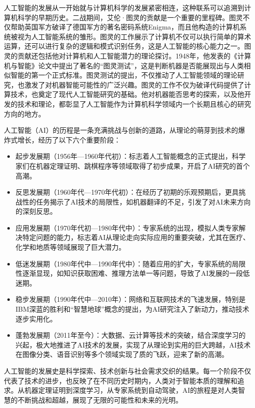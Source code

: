 人工智能的发展从一开始就与计算机科学的发展紧密相连，这种联系可以追溯到计算机科学的早期历史。二战期间，艾伦·图灵的贡献是一个重要的里程碑。图灵不仅帮助英国军方破译了德国军方的著名密码系统Enigma，而且他构造的计算机系统被视为人工智能系统的雏形。图灵的工作展示了计算机不仅可以执行简单的算术运算，还可以进行复杂的逻辑和模式识别任务，这是人工智能的核心能力之一。图灵的贡献还包括他对计算机和人工智能潜力的理论探讨。1948年，他发表的《计算机与智能》论文中提出了著名的“图灵测试”，这是判断机器是否能展现出与人类相似智能的第一个正式标准。图灵测试的提出，不仅推动了人工智能领域的理论研究，也激发了对机器智能可能性的广泛兴趣。图灵的工作不仅为破译代码提供了计算技术，也奠定了现代人工智能研究的基础。他对机器能否思考的探索，以及他开发的技术和理论，都彰显了人工智能作为计算机科学领域内一个长期且核心的研究方向的地方。

人工智能（AI）的历程是一条充满挑战与创新的道路，从理论的萌芽到技术的爆炸式增长，经历了以下六个重要阶段：
\begin{itemize}
    \item 起步发展期（1956年—1960年代初）：标志着人工智能概念的正式提出，科学家们在机器定理证明、跳棋程序等领域取得了初步成果，开启了AI研究的首个高潮。
    \item 反思发展期（1960年代—1970年代初）：在经历了初期的乐观预期后，更具挑战性的任务揭示了AI技术的局限性，如机器翻译的不足，引发了对AI未来方向的深刻反思。
    \item 应用发展期（1970年代初—1980年代中）：专家系统的出现，模拟人类专家解决特定问题的能力，标志着AI从理论走向实际应用的重要突破，尤其在医疗、化学和地质等领域展现了巨大潜力。
    \item 低迷发展期（1980年代中—1990年代中）：随着应用的扩大，专家系统的局限性逐渐显现，如知识获取困难、推理方法单一等问题，导致了AI发展的一段低迷期。
    \item 稳步发展期（1990年代中—2010年）：网络和互联网技术的飞速发展，特别是IBM深蓝的胜利和“智慧地球”概念的提出，为AI研究注入了新动力，推动技术逐步实用化。
    \item 蓬勃发展期（2011年至今）：大数据、云计算等技术的突破，结合深度学习的兴起，极大地推进了AI技术的发展，实现了从理论到实用的巨大跨越，AI技术在图像分类、语音识别等多个领域实现了质的飞跃，迎来了新的高潮。
\end{itemize}

人工智能的发展史是科学探索、技术创新与社会需求交织的结果。每一个阶段不仅代表了技术的进步，也反映了在不同历史时期内，人类对于智能本质的理解和追求。从机器定理证明到深度学习，从专家系统到自动驾驶，AI的旅程是对人类智慧的不断挑战和超越，展现了无限的可能性和未来的光明。

